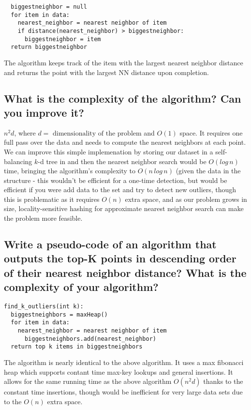 \documentclass{article}
\begin{document}
\begin{lstlisting}
  biggestneighbor = null
  for item in data:
    nearest_neighbor = nearest neighbor of item
    if distance(nearest_neighbor) > biggestneighbor:
      biggestneighbor = item
  return biggestneighbor
\end{lstlisting}
The algorithm keeps track of the item with the largest nearest neighbor
distance and returns the point with the largest NN distance upon completion. 


\subsection{What is the complexity of the algorithm? Can you improve it?}
$n^2d$, where $d= \text{ dimensionality of the problem}$ and $O(1)$ space. It
requires one full pass over the data and needs to compute the nearest neighbors
at each point. We can improve this simple implemenation by storing our
dataset in a self-balancing $k$-d tree in and then
the nearest neighbor search would be $O(log\, n)$ time, bringing the
algorithm's complexity to $O(n\, log\,n)$ (given the data in the structure -
this wouldn't be efficient for a one-time detection, but would be efficient if
you were add data to the set and try to detect new outliers, though this is
problematic as it requires $O(n)$ extra space, and as our problem grows in
size, locality-sensitive hashing for approximate nearest neighbor search can
make the problem more feasible. 


 \subsection{ Write a pseudo-code of an algorithm that outputs the top-K points
 in descending order of their nearest neighbor distance? What is the complexity
 of your algorithm?}
\begin{lstlisting}
find_k_outliers(int k):
  biggestneighbors = maxHeap()
  for item in data:
    nearest_neighbor = nearest neighbor of item
      biggestneighbors.add(nearest_neighbor)
  return top k items in biggestneighbors
\end{lstlisting}
  
  The algorithm is nearly identical to the above algorithm. It uses a max
  fibonacci heap which supports contant time max-key lookups and general insertions. 
  It allows for the same running time as the above algorithm $O(n^2d)$ thanks to the
  constant time insertions, though would be inefficient for very large data
  sets due to the $O(n)$ extra space.   
  
  
  
  
  
  
\end{document}
